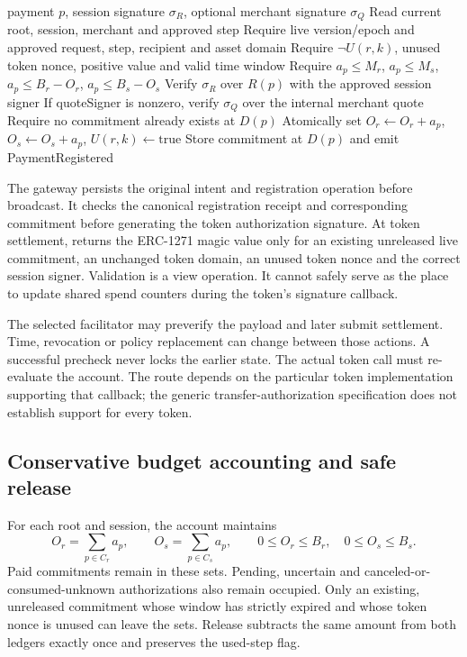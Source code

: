 \begin{algorithm}[htbp]\caption{Atomic registration (implementation-oriented specification)}\label{alg:register}
\begin{algorithmic}[1]
\Require payment $p$, session signature $\sigma_R$, optional merchant signature $\sigma_Q$
\State Read current root, session, merchant and approved step
\State Require live version/epoch and approved request, step, recipient and asset domain
\State Require $\neg U(r,k)$, unused token nonce, positive value and valid time window
\State Require $a_p\le M_r$, $a_p\le M_s$, $a_p\le B_r-O_r$, $a_p\le B_s-O_s$
\State Verify $\sigma_R$ over $R(p)$ with the approved session signer
\State If quoteSigner is nonzero, verify $\sigma_Q$ over the internal merchant quote
\State Require no commitment already exists at $D(p)$
\State Atomically set $O_r\gets O_r+a_p$, $O_s\gets O_s+a_p$, $U(r,k)\gets\mathrm{true}$
\State Store commitment at $D(p)$ and emit PaymentRegistered
\end{algorithmic}
\end{algorithm}

The gateway persists the original intent and registration operation before broadcast. It checks the canonical registration receipt and corresponding commitment before generating the token authorization signature. At token settlement,  returns the ERC-1271 magic value only for an existing unreleased live commitment, an unchanged token domain, an unused token nonce and the correct session signer.\citep{erc1271} Validation is a view operation. It cannot safely serve as the place to update shared spend counters during the token's signature callback.

The selected facilitator may preverify the payload and later submit settlement. Time, revocation or policy replacement can change between those actions. A successful precheck never locks the earlier state. The actual token call must re-evaluate the account. The route depends on the particular token implementation supporting that callback; the generic transfer-authorization specification does not establish support for every token.\citep{erc3009,x402compat}

\subsection{Conservative budget accounting and safe release}
For each root and session, the account maintains
\begin{equation}\label{eq:ledger}
 O_r=\sum_{p\in C_r} a_p,\qquad O_s=\sum_{p\in C_s}a_p,\qquad 0\le O_r\le B_r,\quad 0\le O_s\le B_s.
\end{equation}
Paid commitments remain in these sets. Pending, uncertain and canceled-or-consumed-unknown authorizations also remain occupied. Only an existing, unreleased commitment whose window has strictly expired and whose token nonce is unused can leave the sets. Release subtracts the same amount from both ledgers exactly once and preserves the used-step flag.

